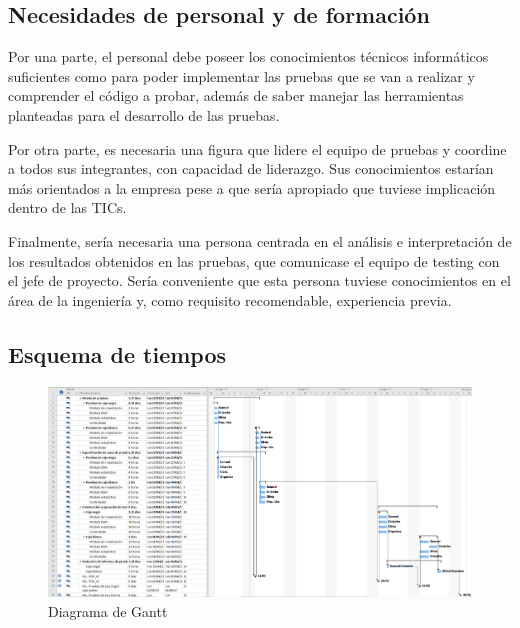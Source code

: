 \documentclass[10pt,a4paper]{article}
\begin{document}
	\subsection{Necesidades de personal y de formación}
		Por una parte, el personal debe poseer los conocimientos técnicos informáticos suficientes como para poder implementar las pruebas que se van a realizar y comprender el código a probar, además de saber manejar las herramientas planteadas para el desarrollo de las pruebas.

		Por otra parte, es necesaria una figura que lidere el equipo de pruebas y coordine a todos sus integrantes, con capacidad de liderazgo. Sus conocimientos estarían más orientados a la empresa pese a que sería apropiado que tuviese implicación dentro de las TICs.

		Finalmente, sería necesaria una persona centrada en el análisis e interpretación de los resultados obtenidos en las pruebas, que comunicase el equipo de testing con el jefe de proyecto. Sería conveniente que esta persona tuviese conocimientos en el área de la ingeniería y, como requisito recomendable, experiencia previa.


	\subsection{Esquema de tiempos}
		\begin{figure}[htpb]
			\centering
			\includegraphics[width=\textwidth]{../anexos/PlanDePruebas.PNG}
			\caption{Diagrama de Gantt}
			\label{fig:gantt}
		\end{figure} 
\end{document}
